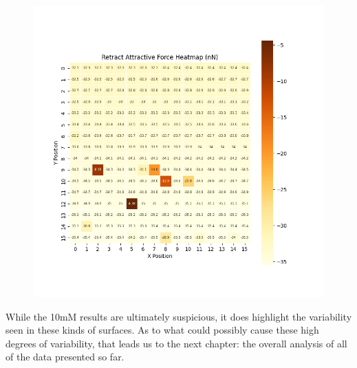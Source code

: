 \begin{figure}[h!]
\centering
\includegraphics[width=\textwidth]{chapter7/ForceMaps/10mM/Retract_heatmap.png}
\caption{}
\label{fig:pHOverall}
\end{figure}

While the 10mM results are ultimately suspicious, it does highlight the variability seen in these kinds of surfaces. As to what could possibly cause these high degrees of variability, that leads us to the next chapter: the overall analysis of all of the data presented so far.
